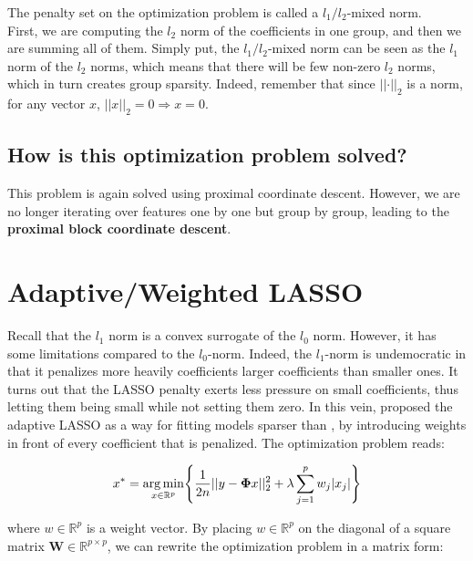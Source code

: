 \documentclass[a4paper,10pt]{article}
\theoremstyle{definition}
\begin{document}
The penalty set on the optimization problem is called a $l_1/l_2$-mixed norm.
\\

First, we are computing the $l_2$ norm of the coefficients in one group, and then we are summing all of them. Simply put, the $l_1/l_2$-mixed norm can be seen
as the $l_1$ norm of the $l_2$ norms, which means that there will be few non-zero $l_2$ norms, which in turn creates group sparsity. Indeed, remember that since $\lvert \lvert \cdot \rvert \rvert_2$ is a norm, for any vector $x$,
$\lvert\lvert x \rvert\rvert_2 = 0 \Rightarrow x = 0$.

\subsection*{How is this optimization problem solved?}

This problem is again solved using proximal coordinate descent. However, we are no longer iterating over features one by one but group by group, leading to the \textbf{proximal block coordinate descent}.

\section{Adaptive/Weighted LASSO}
\label{section_3}

Recall that the $l_1$ norm is a convex surrogate of the $l_0$ norm. However, it has some limitations compared to
the $l_0$-norm. Indeed, the $l_1$-norm is undemocratic in that it penalizes more heavily coefficients larger coefficients than smaller ones. It turns out that the LASSO penalty exerts less pressure on small coefficients,
thus letting them being small while not setting them zero. In this vein, \cite{Zou06} proposed the adaptive LASSO as a way for fitting models sparser than , by introducing weights in front of every coefficient that is
penalized. The optimization problem reads:

\begin{equation*}
    x^* = \operatorname*{arg\,min}_{x \in \mathbb{R}^p} \Biggl\{ \frac{1}{2n} \lvert\lvert y - \mathbf{\Phi}x \rvert\rvert_2^2 + \lambda \sum_{j=1}^p w_j \lvert x_j \rvert \Biggr\}
\end{equation*}

where $w \in \mathbb{R}^p$ is a weight vector. By placing $w \in \mathbb{R}^p$ on the diagonal of a square matrix $\mathbf{W} \in \mathbb{R}^{p \times p}$, we can rewrite the optimization problem in a matrix form:
\end{document}

